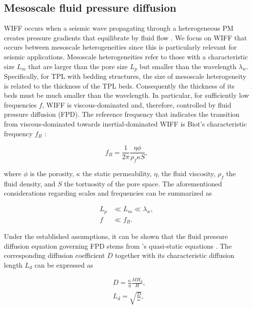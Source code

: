 \documentclass[draft]{agujournal2019}
\begin{document}
\subsection{Mesoscale fluid pressure diffusion}
WIFF occurs when a seismic wave propagating through a heterogeneous PM creates
pressure gradients that equilibrate by fluid flow \cite{Muller2010}.
We focus on WIFF that occurs between mesoscale heterogeneities since this is particularly relevant for seismic applications. Mesoscale heterogeneities refer to those with a characteristic size $L_m$ that are larger than the pore size $L_p$ but smaller than the wavelength $\lambda_w$. Specifically, for TPL with bedding structures, the size of mesoscale heterogeneity is related to the thickness of the TPL beds. Consequently the thickness of its beds must be much smaller than the wavelength.
In particular, for sufficiently low frequencies $f$, WIFF is viscous-dominated and, therefore, controlled by fluid pressure diffusion (FPD). The reference frequency that indicates the transition from viscous-dominated towards inertial-dominated WIFF is Biot's characteristic frequency $f_B$ \cite{Biot1956, Dutta1979}:
\begin{linenomath*}
\begin{equation}\label{Eq.1}
f_B= \frac{1}{2 \pi} \frac{\eta \phi}{ \rho_f \kappa S },
\end{equation}
\end{linenomath*}
where $\phi$ is the porosity, $\kappa$  the static permeability, $\eta$, the fluid viscosity,  $\rho_f$ the fluid density, and $S$ the tortuosity of the pore space. The aforementioned considerations regarding scales and frequencies can be summarized as
\begin{linenomath*}
\begin{equation}\label{Eq.2}
\begin{split}
 L_p & \ll L_m \ll \lambda_w, \\
f & \ll f_B.
\end{split}
\end{equation}
\end{linenomath*}
Under the established assumptions, it can be shown that the fluid pressure diffusion equation governing FPD stems from \citeauthor{Biot1941}'s \citeyear{Biot1941} quasi-static equations \cite{Dutta1979, Chandler1981, Norris1993}. The corresponding diffusion coefficient $D$  together with its characteristic diffusion length $L_d$ can be expressed as \cite{Norris1993}
\begin{linenomath*}
\begin{equation}\label{Eq.3}
\begin{split}
&D= \frac {\kappa} {\eta} \frac{M H_d}{H},\\
&L_d=\sqrt{\frac{D}{\omega}},
\end{split}
\end{equation}
\end{linenomath*}
\end{document}
